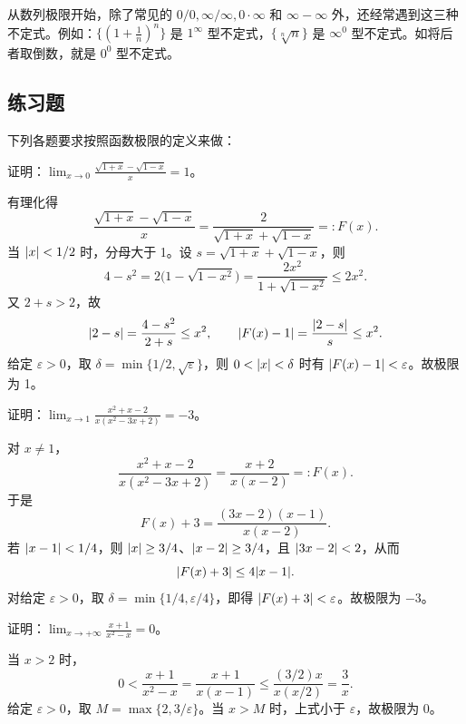 \begin{xremark}
从数列极限开始，除了常见的 $0/0,\infty/\infty,0\cdot\infty$ 和 $\infty-\infty$ 外，还经常遇到这三种不定式。例如：$\{(1+\frac1n)^n\}$ 是 $1^\infty$ 型不定式，$\{\sqrt[n]{n}\}$ 是 $\infty^0$ 型不定式。如将后者取倒数，就是 $0^0$ 型不定式。
\end{xremark}

\subsection{练习题}

下列各题要求按照函数极限的定义来做：

\begin{xexercise}[1]
证明：$\displaystyle\lim_{x\to0}\frac{\sqrt{1+x}-\sqrt{1-x}}{x}=1$。
\end{xexercise}
\begin{xsolution}
有理化得
\[
  \frac{\sqrt{1+x}-\sqrt{1-x}}x
  =\frac{2}{\sqrt{1+x}+\sqrt{1-x}}=:F(x).
\]
当 $\lvert x\rvert<1/2$ 时，分母大于 1。设
$s=\sqrt{1+x}+\sqrt{1-x}$，则
\[
  4-s^2=2\bigl(1-\sqrt{1-x^2}\bigr)
  =\frac{2x^2}{1+\sqrt{1-x^2}}\leq2x^2.
\]
又 $2+s>2$，故
\[
  \lvert2-s\rvert=\frac{4-s^2}{2+s}\leq x^2,
  \qquad
  \lvert F(x)-1\rvert=\frac{\lvert2-s\rvert}s\leq x^2.
\]
给定 $\varepsilon>0$，取
$\delta=\min\{1/2,\sqrt\varepsilon\}$，则 $0<\lvert x\rvert<\delta$ 时有 $\lvert F(x)-1\rvert<\varepsilon$。故极限为 1。
\end{xsolution}


\begin{xexercise}[2]
证明：$\displaystyle\lim_{x\to1}\frac{x^2+x-2}{x(x^2-3x+2)}=-3$。
\end{xexercise}
\begin{xsolution}
对 $x\ne1$，
\[
  \frac{x^2+x-2}{x(x^2-3x+2)}
  =\frac{x+2}{x(x-2)}=:F(x).
\]
于是
\[
  F(x)+3=\frac{(3x-2)(x-1)}{x(x-2)}.
\]
若 $\lvert x-1\rvert<1/4$，则 $\lvert x\rvert\geq3/4$、$\lvert x-2\rvert\geq3/4$，且 $\lvert3x-2\rvert<2$，从而
\[
  \lvert F(x)+3\rvert\leq4\lvert x-1\rvert.
\]
对给定 $\varepsilon>0$，取
$\delta=\min\{1/4,\varepsilon/4\}$，即得 $\lvert F(x)+3\rvert<\varepsilon$。故极限为 $-3$。
\end{xsolution}


\begin{xexercise}[3]
证明：$\displaystyle\lim_{x\to+\infty}\frac{x+1}{x^2-x}=0$。
\end{xexercise}
\begin{xsolution}
当 $x>2$ 时，
\[
  0<\frac{x+1}{x^2-x}
  =\frac{x+1}{x(x-1)}
  \leq\frac{(3/2)x}{x(x/2)}=\frac3x.
\]
给定 $\varepsilon>0$，取 $M=\max\{2,3/\varepsilon\}$。当 $x>M$ 时，上式小于 $\varepsilon$，故极限为 0。
\end{xsolution}


